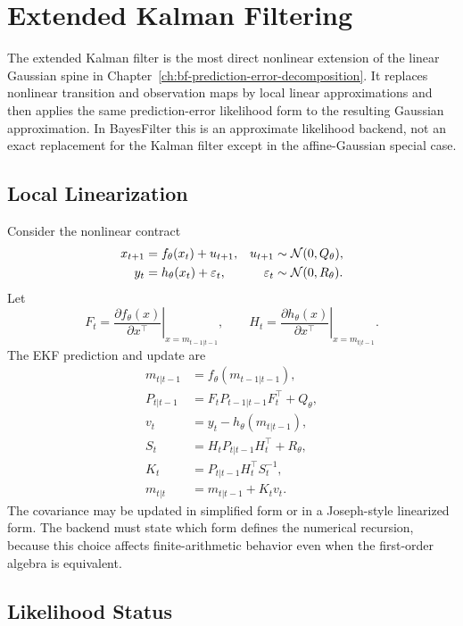 \chapter{Extended Kalman Filtering}
\label{ch:bf-ekf}

The extended Kalman filter is the most direct nonlinear extension of the
linear Gaussian spine in Chapter~\ref{ch:bf-prediction-error-decomposition}.
It replaces nonlinear transition and observation maps by local linear
approximations and then applies the same prediction-error likelihood form to
the resulting Gaussian approximation.  In BayesFilter this is an approximate
likelihood backend, not an exact replacement for the Kalman filter except in
the affine-Gaussian special case.

\section{Local Linearization}
\label{sec:bf-ekf-local-linearization}

Consider the nonlinear contract
\begin{align}
  x_{t+1} &= f_\theta(x_t) + u_{t+1},
  & u_{t+1} &\sim \mathcal{N}(0,Q_\theta), \label{eq:bf-ekf-transition}\\
  y_t &= h_\theta(x_t) + \varepsilon_t,
  & \varepsilon_t &\sim \mathcal{N}(0,R_\theta). \label{eq:bf-ekf-observation}
\end{align}
Let
\[
  F_t =
  \left.\frac{\partial f_\theta(x)}{\partial x^\top}
  \right|_{x=m_{t-1|t-1}},
  \qquad
  H_t =
  \left.\frac{\partial h_\theta(x)}{\partial x^\top}
  \right|_{x=m_{t|t-1}} .
\]
The EKF prediction and update are
\begin{align}
  m_{t|t-1} &= f_\theta(m_{t-1|t-1}), \\
  P_{t|t-1} &= F_tP_{t-1|t-1}F_t^\top+Q_\theta, \\
  v_t &= y_t-h_\theta(m_{t|t-1}), \\
  S_t &= H_tP_{t|t-1}H_t^\top+R_\theta, \\
  K_t &= P_{t|t-1}H_t^\top S_t^{-1}, \\
  m_{t|t} &= m_{t|t-1}+K_tv_t .
\end{align}
The covariance may be updated in simplified form or in a Joseph-style
linearized form.  The backend must state which form defines the numerical
recursion, because this choice affects finite-arithmetic behavior even when the
first-order algebra is equivalent.

\section{Likelihood Status}
\label{sec:bf-ekf-likelihood-status}

